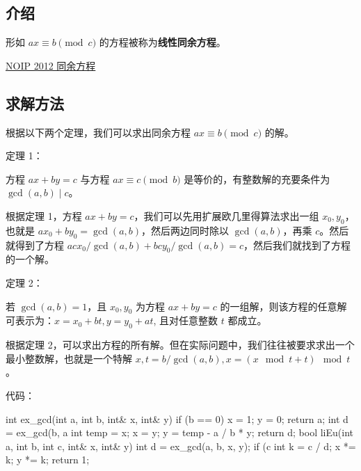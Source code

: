 
\subsection{介绍}

形如 $ax \equiv b \pmod c$ 的方程被称为\textbf{线性同余方程}。

\href{https://www.luogu.org/problemnew/show/P1082}{NOIP 2012 同余方程}

\subsection{求解方法}

根据以下两个定理，我们可以求出同余方程 $ax \equiv b \pmod c$ 的解。

定理 1：

\begin{QUOTE}{}{}
方程 $ax+by=c$ 与方程 $ax \equiv c \pmod b$ 是等价的，有整数解的充要条件为 $\gcd(a,b) \mid c$。
\end{QUOTE}

根据定理 1，方程 $ax+by=c$，我们可以先用扩展欧几里得算法求出一组 $x_0,y_0$，也就是 $ax_0+by_0=\gcd(a,b)$，然后两边同时除以 $\gcd(a,b)$，再乘 $c$。然后就得到了方程 $acx_0/\gcd(a,b)+bcy_0/\gcd(a,b)=c$，然后我们就找到了方程的一个解。

定理 2：

\begin{QUOTE}{}{}
若 $\gcd(a,b)=1$，且 $x_0,y_0$ 为方程 $ax+by=c$ 的一组解，则该方程的任意解可表示为：$x=x_0+bt,y=y_0+at$, 且对任意整数 $t$ 都成立。
\end{QUOTE}

根据定理 2，可以求出方程的所有解。但在实际问题中，我们往往被要求求出一个最小整数解，也就是一个特解 $x,t=b/\gcd(a,b),x=(x \mod t+t)\mod t$。

代码：

\begin{cppcode}
int ex_gcd(int a, int b, int& x, int& y) {
  if (b == 0) {
    x = 1;
    y = 0;
    return a;
  }
  int d = ex_gcd(b, a %
  int temp = x;
  x = y;
  y = temp - a / b * y;
  return d;
}
bool liEu(int a, int b, int c, int& x, int& y) {
  int d = ex_gcd(a, b, x, y);
  if (c %
  int k = c / d;
  x *= k;
  y *= k;
  return 1;
}
\end{cppcode}

